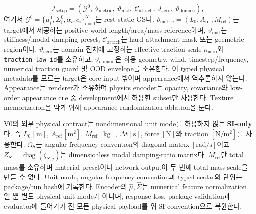 \documentclass[11pt]{article}
\newcommand{\code}[1]{{\small\nolinkurl{#1}}}
\begin{document}
\begin{equation}
  \mathcal I_{\mathrm{setup}}
  =\left(\mathcal G^0,\ \vartheta_{\mathrm{metric}},\ \vartheta_{\mathrm{mat}},\
  \mathcal C_{\mathrm{attach}},\ \vartheta_{\mathrm{aero}},\ \vartheta_{\mathrm{domain}}\right),
  \label{eq:rd-setup-input}
\end{equation}
여기서 \(\mathcal G^0=\{\mu_i^0,\Sigma_i^0,\alpha_i,c_i\}_{i=1}^{N}\)는 rest static GS다.
\(\vartheta_{\mathrm{metric}}=(L_0,A_{\mathrm{ref}},M_{\mathrm{ref}})\)는 target에서 제공하는
positive world-length/area/mass reference이며, \(\vartheta_{\mathrm{mat}}\)는 stiffness/modal-damping preset,
\(\mathcal C_{\mathrm{attach}}\)는 hard attachment mask 또는 geometric region이다.
\(\vartheta_{\mathrm{aero}}\)는 domain 전체에 고정하는 effective traction scale
\(\kappa_{\mathrm{aero}}\)와 \code{traction_law_id}를 소유하고,
\(\vartheta_{\mathrm{domain}}\)은 허용 geometry, wind, timestep/frequency, numerical traction guard 및
OOD envelope를 소유한다. 이 typed physical metadata를 모르는 target은 core input 밖이며 appearance에서 역추론하지 않는다.
Appearance는 renderer가 소유하며 physics encoder는 opacity, covariance와 low-order appearance cue 중
development에서 허용한 subset만 사용한다. Texture memorization을 막기 위해 appearance randomization ablation을 둔다.

V0의 외부 physical contract는 nondimensional unit mode를 허용하지 않는 \textbf{SI-only}다.
즉 \(L_0\,[\mathrm m]\), \(A_{\mathrm{ref}}\,[\mathrm m^2]\), \(M_{\mathrm{ref}}\,[\mathrm{kg}]\),
\(\Delta t\,[\mathrm s]\), force \([\mathrm N]\)와 traction \([\mathrm{N/m^2}]\)를 사용한다.
\(\Omega_S\)는 angular-frequency convention의 diagonal matrix \([\mathrm{rad/s}]\)이고
\(Z_S=\operatorname{diag}(\zeta_{S,j})\)는 dimensionless modal damping-ratio matrix다.
\(M_{\mathrm{ref}}\)만 total mass를 소유하며 material preset이나 network output이 두 번째 total-mass
scale을 만들 수 없다. Unit mode, angular-frequency convention과 typed scalar의 단위는 package/run hash에 기록한다.
Encoder의 \(\widehat\mu,\widehat\Sigma\)는 numerical feature normalization일 뿐 별도 physical unit mode가 아니며,
response loss, package validation과 evaluator에 들어가기 전 모든 physical payload를 위 SI convention으로 복원한다.
\end{document}
